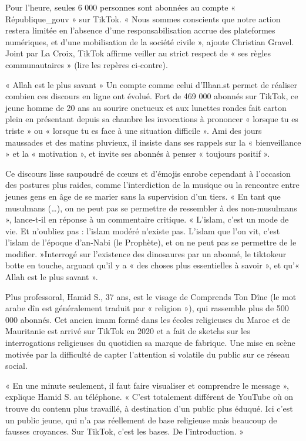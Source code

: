  

Pour l’heure, seules 6 000 personnes sont abonnées au compte « République_gouv » sur TikTok. « Nous sommes conscients que notre action restera limitée en l’absence d’une responsabilisation accrue des plateformes numériques, et d’une mobilisation de la société civile », ajoute Christian Gravel. Joint par La Croix, TikTok affirme veiller au strict respect de « ses règles communautaires » (lire les repères ci-contre).

« Allah est le plus savant »
Un compte comme celui d’Ilhan.st permet de réaliser combien ces discours en ligne ont évolué. Fort de 469 000 abonnés sur TikTok, ce jeune homme de 20 ans au sourire onctueux et aux lunettes rondes fait carton plein en présentant depuis sa chambre les invocations à prononcer « lorsque tu es triste » ou « lorsque tu es face à une situation difficile ». Ami des jours maussades et des matins pluvieux, il insiste dans ses rappels sur la « bienveillance » et la « motivation », et invite ses abonnés à penser « toujours positif ».


Ce discours lisse saupoudré de cœurs et d’émojis enrobe cependant à l’occasion des postures plus raides, comme l’interdiction de la musique ou la rencontre entre jeunes gens en âge de se marier sans la supervision d’un tiers. « En tant que musulmans (…), on ne peut pas se permettre de ressembler à des non-musulmans », lance-t-il en réponse à un commentaire critique. « L’islam, c’est un mode de vie. Et n’oubliez pas : l’islam modéré n’existe pas. L’islam que l’on vit, c’est l’islam de l’époque d’an-Nabi (le Prophète), et on ne peut pas se permettre de le modifier. »Interrogé sur l’existence des dinosaures par un abonné, le tiktokeur botte en touche, arguant qu’il y a « des choses plus essentielles à savoir », et qu’« Allah est le plus savant ».
 
Plus professoral, Hamid S., 37 ans, est le visage de Comprends Ton Dîne (le mot arabe dîn est généralement traduit par « religion »), qui rassemble plus de 500 000 abonnés. Cet ancien imam formé dans les écoles religieuses du Maroc et de Mauritanie est arrivé sur TikTok en 2020 et a fait de sketchs sur les interrogations religieuses du quotidien sa marque de fabrique. Une mise en scène motivée par la difficulté de capter l’attention si volatile du public sur ce réseau social.

« En une minute seulement, il faut faire visualiser et comprendre le message », explique Hamid S. au téléphone. « C’est totalement différent de YouTube où on trouve du contenu plus travaillé, à destination d’un public plus éduqué. Ici c’est un public jeune, qui n’a pas réellement de base religieuse mais beaucoup de fausses croyances. Sur TikTok, c’est les bases. De l’introduction. »

